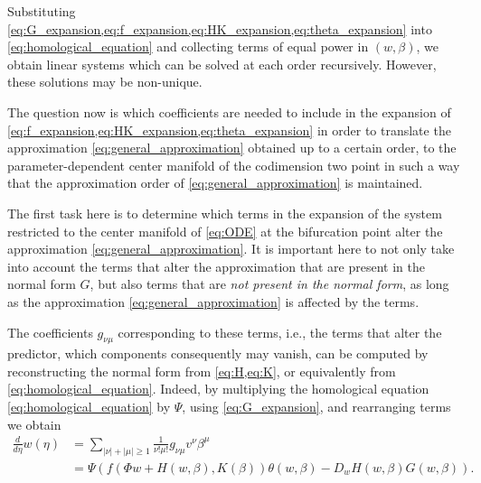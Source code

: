 Substituting
\cref{eq:G_expansion,eq:f_expansion,eq:HK_expansion,eq:theta_expansion} into
\cref{eq:homological_equation} and collecting terms of equal power in $(w,\beta)$, we
obtain linear systems which can be solved at each order recursively. However,
these solutions may be non-unique.

The question now is which coefficients are needed to include in the expansion of
\cref{eq:f_expansion,eq:HK_expansion,eq:theta_expansion} in order to translate the 
approximation \cref{eq:general_approximation} obtained up to a certain order,
to the parameter-dependent center manifold of the codimension two point in such
a way that the approximation order of \cref{eq:general_approximation} is maintained.

The first task here is to determine which terms in the expansion of the 
system restricted to the center manifold of \cref{eq:ODE} at the bifurcation
point alter the approximation \cref{eq:general_approximation}.  It is
important here to not only take into account the terms that alter the
approximation that are present in the normal form $G$, but also terms that are
\emph{not present in the normal form}, as long as the approximation
\cref{eq:general_approximation} is affected by the terms. 

The coefficients $g_{\nu\mu}$ corresponding to these terms, i.e., the terms that
alter the predictor, which components consequently may vanish, can be computed
by reconstructing the normal form from \cref{eq:H,eq:K}, or equivalently from
\cref{eq:homological_equation}. Indeed, by multiplying the homological equation
\cref{eq:homological_equation} by $\Psi$, using \cref{eq:G_expansion}, and
rearranging terms we obtain
\begin{align*}
\frac{d}{d\eta} w(\eta) &=  \sum_{|\nu|+|\mu| \geq 1} \frac{1}{\nu!\mu!} g_{\nu\mu} v^\nu \beta^\mu \\ 
                        &= \Psi (f(\Phi w + H(w,\beta), K(\beta)) \theta(w, \beta) - D_wH(w, \beta)G(w,\beta)).
\end{align*}


